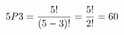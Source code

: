 \documentclass[preview]{standalone}
\begin{document}
\begin{align*}
\special{dvisvgm:raw <g id='unique000'>}5P3 = \frac{5!}{(5-3)!} = \frac{5!}{2!} = 60\special{dvisvgm:raw </g>}
\end{align*}
\end{document}
